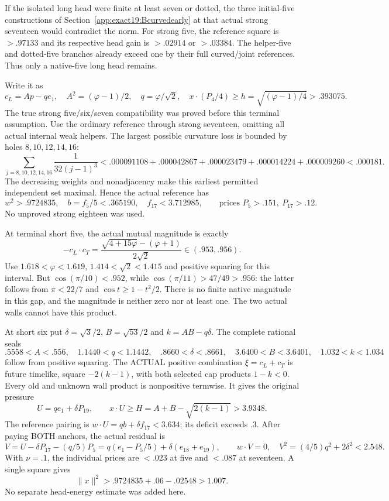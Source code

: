 \documentclass[11pt]{article}
\theoremstyle{definition}
\theoremstyle{remark}
\begin{document}
If the isolated long head were
finite at least seven or dotted,
the three initial-five constructions
of Section~\ref{app:exact19:Bcurvedearly}
at that actual strong seventeen
would contradict the norm.
For strong five, the reference
square is \(>.97133\) and its
respective head gain is
\(>.02914\) or \(>.03384\).
The helper-five and dotted-five
branches already exceed one by
their full curved/joint references.
Thus only a native-five long
head remains.

Write it as
\[
 c_L=Ap-qe_1,\quad
 A^2=(\varphi-1)/2,\quad q=\varphi/\sqrt2,\quad
          x\cdot(P_4/4)\ge h=\sqrt{(\varphi-1)/4}>.393075 .
\]
The true strong five/six/seven
compatibility was proved before
this terminal assumption.
Use the ordinary reference through
strong seventeen, omitting all
actual internal weak helpers.
The largest possible curvature
loss is bounded by holes
\(8,10,12,14,16\):
\[
 \sum_{j=8,10,12,14,16}\frac1{32(j-1)^3}
 <.000091108+.000042867+.000023479+.000014224+.000009260
 <.000181 .
\]
The decreasing weights and
nonadjacency make this earliest
permitted independent set maximal.
Hence the actual reference has
\[
 w^2>.9724835,\quad b=f_5/5<.365190,\quad
 f_{17}<3.712985,\qquad
                  \text{prices }P_5>.151,\ P_{17}>.12 .
\tag{B19tightref}\label{app:exact19:eq:Btightref}
\]
No unproved strong eighteen
was used.

At terminal short five, the actual
mutual magnitude is exactly
\[
 -c_L\cdot c_T=
       \frac{\sqrt{4+15\varphi}-(\varphi+1)}{2\sqrt2}
                                 \in(.953,.956).
\]
Use \(1.618<\varphi<1.619\),
\(1.414<\sqrt2<1.415\) and positive
squaring for this interval.
But \(\cos(\pi/10)<.952\), while
\(\cos(\pi/11)>47/49>.956\):
the latter follows from
\(\pi<22/7\) and
\(\cos t\ge1-t^2/2\).
There is no finite native magnitude
in this gap, and the magnitude is
neither zero nor at least one.
The two actual walls cannot have
this product.

At short six put
\(\delta=\sqrt3/2\), \(B=\sqrt{53}/2\)
and \(k=AB-q\delta\).
The complete rational seals
\[
 .5558<A<.556,\quad1.1440<q<1.1442,\quad
 .8660<\delta<.8661,\quad3.6400<B<3.6401,\quad
                                      1.032<k<1.034
\]
follow from positive squaring.
The ACTUAL positive combination
\(\xi=c_L+c_T\) is future timelike,
square \(-2(k-1)\), with both
selected cap products \(1-k<0\).
Every old and unknown wall product
is nonpositive termwise.
It gives the original pressure
\[
 U=qe_1+\delta P_{19},\qquad
              x\cdot U\ge H=A+B-\sqrt{2(k-1)}>3.9348 .
\]
The reference pairing is
\(w\cdot U=qb+\delta f_{17}<3.634\);
its deficit exceeds \(.3\).
After paying BOTH anchors, the
actual residual is
\[
 V=U-\delta P_{17}-(q/5)P_5
          =q(e_1-P_5/5)+\delta(e_{18}+e_{19}),\qquad
       w\cdot V=0,\quad V^2=(4/5)q^2+2\delta^2<2.548 .
\]
With \(\nu=.1\), the individual
prices are \(<.023\) at five and
\(<.087\) at seventeen.
A single square gives
\[
                      \|x\|^2>.9724835+.06-.02548>1.007 .
\]
No separate head-energy estimate
was added here.
\end{document}
